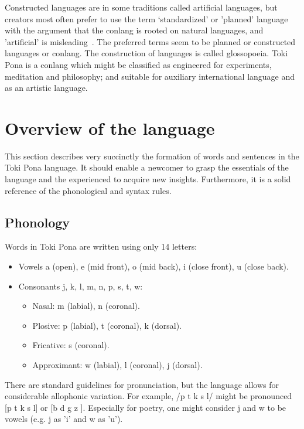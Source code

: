 \documentclass{article}
\begin{document}
Constructed languages are in some traditions called artificial
languages, but creators most often prefer to use the term `standardized'
or 'planned' language with the argument that the conlang
is rooted on natural languages, and 'artificial' is misleading~\cite{conlanWikip}.
The preferred terms seem to be planned or constructed languages
or conlang.
The construction of languages is called glossopoeia.
Toki Pona is a conlang which might be classified
as engineered for experiments, meditation and philosophy;
and suitable for auxiliary international language and
as an artistic language. 



\section{Overview of the language}\label{basics}
This section describes very succinctly the formation of
words and sentences in the Toki Pona language.
It should enable a newcomer to grasp the essentials
of the language and the experienced to
acquire new insights.
Furthermore, it is a solid reference of the phonological and syntax
rules.

\subsection{Phonology}\label{phonology}
Words in Toki Pona are written using only 14 letters:
\begin{itemize}
  \item Vowels a (open), e (mid front), o (mid back), i (close front),
    u (close back).
  \item Consonants j, k, l, m, n, p, s, t, w:
    \begin{itemize}
      \item Nasal: m (labial), n (coronal).
      \item Plosive: p (labial), t (coronal), k (dorsal).
      \item Fricative: s (coronal).
      \item Approximant: w (labial), l (coronal), j (dorsal).
    \end{itemize}
\end{itemize}

There are standard guidelines for pronunciation,
but the language allows for considerable allophonic
variation.
For example, /p t k s l/ might be pronounced
[p t k s l] or [b d g z ].
Especially for poetry, one might consider
j and w to be vowels
(e.g. j as 'i' and w as 'u').
\end{document}
